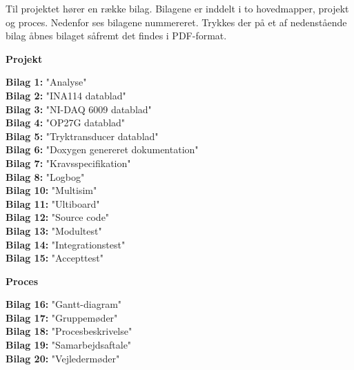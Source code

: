 Til projektet hører en række bilag. Bilagene er inddelt i to hovedmapper, projekt og proces. Nedenfor ses bilagene nummereret. Trykkes der på et af nedenstående bilag åbnes bilaget såfremt det findes i PDF-format.

\textbf{Projekt}

\textbf{Bilag 1:} "Analyse" \\
\textbf{Bilag 2:} "INA114 datablad" \\
\textbf{Bilag 3:} "NI-DAQ 6009 datablad" \\
\textbf{Bilag 4:} "OP27G datablad" \\
\textbf{Bilag 5:} "Tryktransducer datablad" \\
\textbf{Bilag 6:} "Doxygen genereret dokumentation" \\ 
\textbf{Bilag 7:} "Kravsspecifikation" \\
\textbf{Bilag 8:} "Logbog" \\
\textbf{Bilag 10:} "Multisim" \\
\textbf{Bilag 11:} "Ultiboard" \\
\textbf{Bilag 12:} "Source code" \\
\textbf{Bilag 13:} "Modultest" \\
\textbf{Bilag 14:} "Integrationstest" \\
\textbf{Bilag 15:} "Accepttest"

\textbf{Proces}

\textbf{Bilag 16:} "Gantt-diagram" \\
\textbf{Bilag 17:} "Gruppemøder" \\
\textbf{Bilag 18:} "Procesbeskrivelse" \\
\textbf{Bilag 19:} "Samarbejdsaftale" \\
\textbf{Bilag 20:} "Vejledermøder" 

